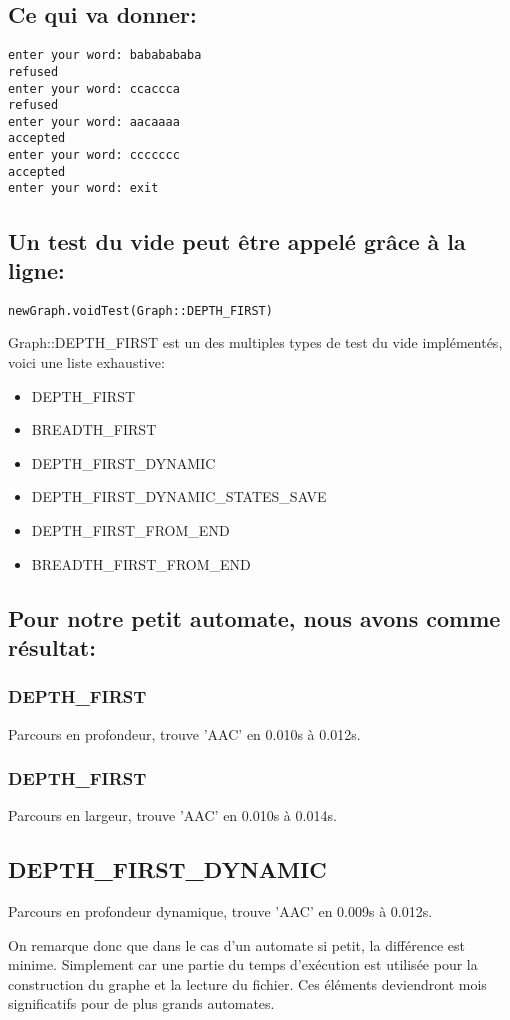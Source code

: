 \subsection{Ce qui va donner:}
\begin{verbatim}
enter your word: bababababa
refused
enter your word: ccaccca
refused
enter your word: aacaaaa
accepted
enter your word: ccccccc
accepted
enter your word: exit

\end{verbatim}

\subsection{Un test du vide peut être appelé grâce à la ligne:}
\begin{verbatim}
newGraph.voidTest(Graph::DEPTH_FIRST)
\end{verbatim}
Graph::DEPTH\_FIRST est un des multiples types de test du vide implémentés, voici une liste exhaustive:
\begin{itemize}
    \item DEPTH\_FIRST
    \item BREADTH\_FIRST
    \item DEPTH\_FIRST\_DYNAMIC
    \item DEPTH\_FIRST\_DYNAMIC\_STATES\_SAVE
    \item DEPTH\_FIRST\_FROM\_END
    \item BREADTH\_FIRST\_FROM\_END
\end{itemize}

\subsection{Pour notre petit automate, nous avons comme résultat:}
\subsubsection{DEPTH\_FIRST}
Parcours en profondeur, trouve 'AAC' en 0.010s à 0.012s.
\subsubsection{DEPTH\_FIRST}
Parcours en largeur, trouve 'AAC' en 0.010s à 0.014s.
\subsection{DEPTH\_FIRST\_DYNAMIC}
Parcours en profondeur dynamique, trouve 'AAC' en 0.009s à 0.012s.\par

On remarque donc que dans le cas d'un automate si petit, la différence est minime. Simplement car une partie du temps d'exécution est utilisée pour la construction du graphe et la lecture du fichier. Ces éléments deviendront mois significatifs pour de plus grands automates.
